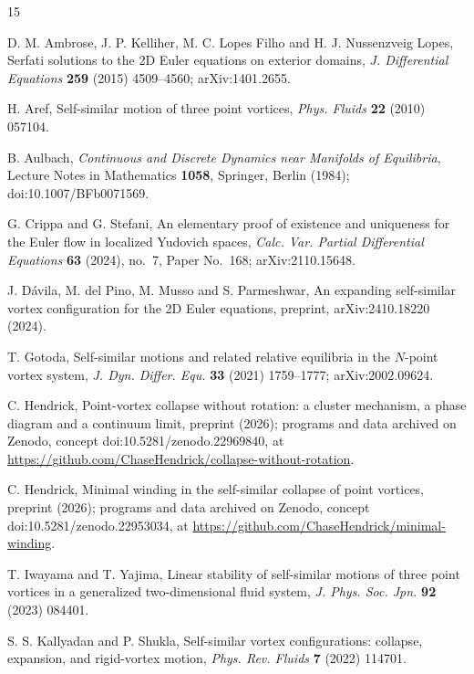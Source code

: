 \documentclass[11pt]{article}
\theoremstyle{definition}
\begin{document}
\begin{thebibliography}{15}

 D. M. Ambrose, J. P. Kelliher, M. C. Lopes Filho and H. J. Nussenzveig Lopes, Serfati solutions to the 2D Euler equations on exterior domains, \emph{J. Differential Equations} \textbf{259} (2015) 4509--4560; arXiv:1401.2655.

 H. Aref, Self-similar motion of three point vortices, \emph{Phys. Fluids} \textbf{22} (2010) 057104.

 B. Aulbach, \emph{Continuous and Discrete Dynamics near Manifolds of Equilibria}, Lecture Notes in Mathematics \textbf{1058}, Springer, Berlin (1984); doi:10.1007/BFb0071569.

 G. Crippa and G. Stefani, An elementary proof of existence and uniqueness for the Euler flow in localized Yudovich spaces, \emph{Calc. Var. Partial Differential Equations} \textbf{63} (2024), no.~7, Paper No.~168; arXiv:2110.15648.

 J. D\'avila, M. del Pino, M. Musso and S. Parmeshwar, An expanding self-similar vortex configuration for the 2D Euler equations, preprint, arXiv:2410.18220 (2024).

 T. Gotoda, Self-similar motions and related relative equilibria in the $N$-point vortex system, \emph{J. Dyn. Differ. Equ.} \textbf{33} (2021) 1759--1777; arXiv:2002.09624.

 C. Hendrick, Point-vortex collapse without rotation: a cluster mechanism, a phase diagram and a continuum limit, preprint (2026); programs and data archived on Zenodo, concept doi:10.5281/zenodo.22969840, at \url{https://github.com/ChaseHendrick/collapse-without-rotation}.

 C. Hendrick, Minimal winding in the self-similar collapse of point vortices, preprint (2026); programs and data archived on Zenodo, concept doi:10.5281/zenodo.22953034, at \url{https://github.com/ChaseHendrick/minimal-winding}.

 T. Iwayama and T. Yajima, Linear stability of self-similar motions of three point vortices in a generalized two-dimensional fluid system, \emph{J. Phys. Soc. Jpn.} \textbf{92} (2023) 084401.

 S. S. Kallyadan and P. Shukla, Self-similar vortex configurations: collapse, expansion, and rigid-vortex motion, \emph{Phys. Rev. Fluids} \textbf{7} (2022) 114701.


\end{thebibliography}
\end{document}
